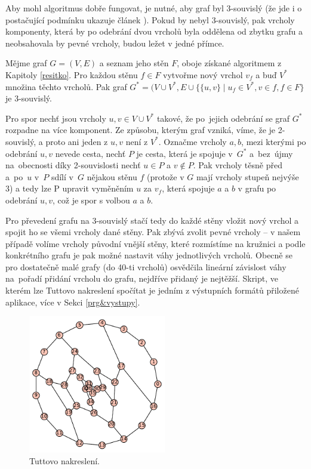 Aby mohl algoritmus dobře fungovat, je nutné, aby graf byl 3-souvislý (že jde i o postačující podmínku ukazuje článek  \cite{Tutte}). Pokud by nebyl 3-souvislý, pak vrcholy komponenty, která by po odebrání dvou vrcholů byla oddělena od zbytku grafu a neobsahovala by pevné vrcholy, budou ležet v jedné přímce.

\begin{tvrz} \label{prevodNa3Spoj}
Mějme graf $G=(V,E)$ a seznam jeho stěn $F$, oboje získané algoritmem z Kapitoly \ref{resitko}. Pro každou stěnu $f \in F$ vytvořme nový vrchol $v_f$ a buď $V^*$ množina těchto vrcholů.  Pak graf $G^* = (V \cup V^*, E \cup \lbrace \lbrace u,v \rbrace \mid u_f \in V^*, v \in f, f \in F\rbrace$ je 3-souvislý.
\end{tvrz}

\begin{dukaz}
Pro spor nechť jsou vrcholy $u,v  \in V\cup V^*$ takové, že po~jejich odebrání se graf $G^*$ rozpadne na více komponent. Ze způsobu, kterým graf vzniká, víme, že je 2-souvislý, a proto ani jeden z $u,v$ není z $V^*$. Označme vrcholy $a,b$, mezi kterými po odebrání $u,v$ nevede cesta, nechť $P$ je cesta, která je spojuje v~$G^*$ a~bez~újmy na~obecnosti díky 2-souvislosti nechť $u \in P$ a $v \notin P$. Pak vrcholy těsně před a~po~$u$ v~$P$ sdílí v~$G$ nějakou stěnu $f$ (protože v $G$ mají vrcholy stupeň nejvýše 3) a tedy lze P upravit vyměněním $u$ za $v_f$, která spojuje $a$ a $b$ v grafu po odebrání $u,v$, což je spor s volbou $a$ a $b$.
\end{dukaz}

Pro převedení grafu na 3-souvislý stačí tedy do každé stěny vložit nový vrchol a spojit ho se všemi vrcholy dané stěny. Pak zbývá zvolit pevné vrcholy -- v našem případě volíme vrcholy původní vnější stěny, které rozmístíme na kružnici a podle konkrétního grafu je pak možné nastavit váhy jednotlivých vrcholů. Obecně se pro dostatečně malé grafy (do 40-ti vrcholů) osvědčila lineární závislost váhy na~pořadí přidání vrcholu do grafu, nejdříve přidaný je nejtěžší. Skript, ve kterém lze Tuttovo nakreslení spočítat je jedním z výstupních formátů přiložené aplikace, více v Sekci \ref{prg&vystupy}.


\begin{figure}[h]\centering
\includegraphics[width = 60mm]{../img/tutteplot}
\caption{Tuttovo nakreslení.}
\label{obr:tutteplot}
\end{figure}